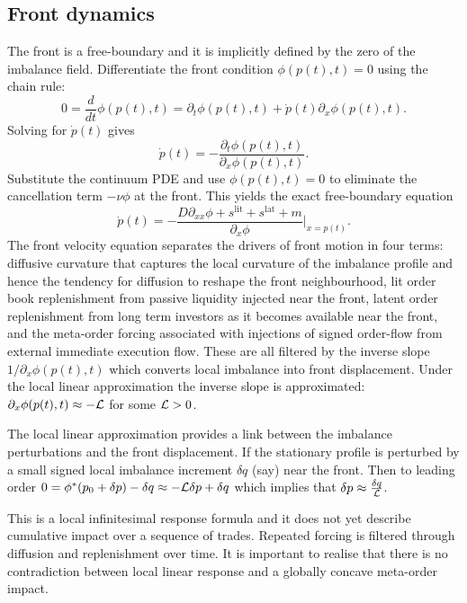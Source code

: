 \documentclass[5p,final]{elsarticle}
\begin{document}
\subsection{Front dynamics} \label{ssec:frontvel}

The front is a free-boundary and it is implicitly defined by the zero of the imbalance field. Differentiate the front condition $\phi(p(t),t)=0$ using the chain rule:
\begin{equation}
0=\frac{d}{dt}\phi(p(t),t)=\partial_t\phi(p(t),t)+\dot p(t)\partial_x\phi(p(t),t).
\end{equation}
Solving for $\dot p(t)$ gives
\begin{equation}
\dot p(t)=-\frac{\partial_t\phi(p(t),t)}{\partial_x\phi(p(t),t)}.
\end{equation}
Substitute the continuum PDE and use $\phi(p(t),t)=0$ to eliminate the cancellation term $-\nu \phi$ at the front. This yields the exact free-boundary equation
\begin{equation}
    \dot p(t)= -\frac{D\partial_{xx}\phi+s^{\mathrm{lit}}+s^{\mathrm{lat}}+m}{\partial_x\phi}\Bigg|_{x=p(t)}.
\label{eq:frontvel}
\end{equation}
The front velocity equation separates the drivers of front motion in four terms: diffusive curvature that captures the local curvature of the imbalance profile and hence the tendency for diffusion to reshape the front neighbourhood, lit order book replenishment from passive liquidity injected near the front, latent order replenishment from long term investors as it becomes available near the front, and the meta-order forcing associated with injections of signed order-flow from external immediate execution flow. These are all filtered by the inverse slope $1/\partial_x \phi(p(t),t)$ which converts local imbalance into front displacement. Under the local linear approximation the inverse slope is approximated: $\partial_x \phi(p(t),t) \approx -{\cal L}$ for some ${\cal L}>0$.

The local linear approximation provides a link between the imbalance perturbations and the front displacement. If the stationary profile is perturbed by a small signed local imbalance increment $\delta q$ (say) near the front. Then to leading order $0=\phi^*(p_0+\delta p) - \delta q \approx - {\cal L} \delta p + \delta q$ which implies that $\delta p \approx \tfrac{\delta q}{\cal L}$. 

This is a local infinitesimal response formula and it does not yet describe cumulative impact over a sequence of trades. Repeated forcing is filtered through diffusion and replenishment over time. It is important to realise that there is no contradiction between local linear response and a globally concave meta-order impact.  
\end{document}
